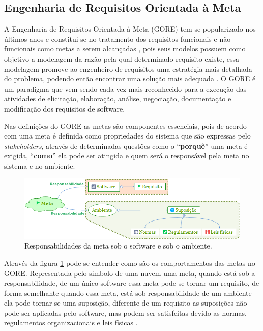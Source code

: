 \subsection{Engenharia de Requisitos Orientada à Meta}

A Engenharia de Requisitos Orientada à Meta (GORE) tem-se popularizado nos últimos anos e constitui-se no tratamento dos requisitos funcionais e não funcionais como metas a serem alcançadas \cite{van2001goal}, pois seus modelos possuem como objetivo a modelagem da razão pela qual determinado requisito existe, essa modelagem promove ao engenheiro de requisitos uma estratégia mais detalhada do problema, podendo então encontrar uma solução mais adequada \cite{van2001goal}\cite{chung2012non}. O GORE é um paradigma que vem sendo cada vez mais reconhecido para a execução das atividades de elicitação, elaboração, análise, negociação, documentação e modificação dos requisitos de software\cite{van2001goal}.

Nas definições do GORE as metas são componentes essenciais, pois de acordo com \cite{van2001goal} uma meta é definida como propriedades do sistema que são expressas pelo \textit{stakeholders}, através de determinadas questões como o “\textbf{porquê}” uma meta é exigida, “\textbf{como}” ela pode ser atingida e quem será o responsável pela meta no sistema e no ambiente.

\begin{figure}[h]
	\centering
	\includegraphics[keepaspectratio=true,scale=0.8]{figuras/GORE.png}
	\caption{Responsabilidades da meta sob o software e sob o ambiente.}
	\label{Gore}
\end{figure}

 Através da figura \ref{Gore} pode-se entender como são os comportamentos das metas no GORE. Representada pelo simbolo de uma nuvem uma meta, quando está sob a responsabilidade, de um único software essa meta pode-se tornar um requisito, de forma semelhante quando essa meta, está sob responsabilidade de um ambiente ela pode tornar-se uma suposição, diferente de um requisito as suposições não pode-ser aplicadas pelo software, mas podem ser satisfeitas devido as normas, regulamentos organizacionais e leis físicas \cite{van2001goal}. 


